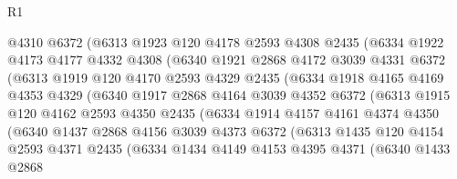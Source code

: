 \begin{lexlean}{R1}
\begin{coremodule}
                @4310
                @6372
                (@6313
                  @1923
                  @120
                  @4178
                  @2593
                  @4308
                  @2435
                  (@6334
                    @1922
                    @4173
                    @4177
                    @4332
                    @4308
                    (@6340
                      @1921
                      @2868
                      @4172
                      @3039
                      @4331
                      @6372
                      (@6313
                        @1919
                        @120
                        @4170
                        @2593
                        @4329
                        @2435
                        (@6334
                          @1918
                          @4165
                          @4169
                          @4353
                          @4329
                          (@6340
                            @1917
                            @2868
                            @4164
                            @3039
                            @4352
                            @6372
                            (@6313
                              @1915
                              @120
                              @4162
                              @2593
                              @4350
                              @2435
                              (@6334
                                @1914
                                @4157
                                @4161
                                @4374
                                @4350
                                (@6340
                                  @1437
                                  @2868
                                  @4156
                                  @3039
                                  @4373
                                  @6372
                                  (@6313
                                    @1435
                                    @120
                                    @4154
                                    @2593
                                    @4371
                                    @2435
                                    (@6334
                                      @1434
                                      @4149
                                      @4153
                                      @4395
                                      @4371
                                      (@6340
                                        @1433
                                        @2868

\end{coremodule}
\end{lexlean}
